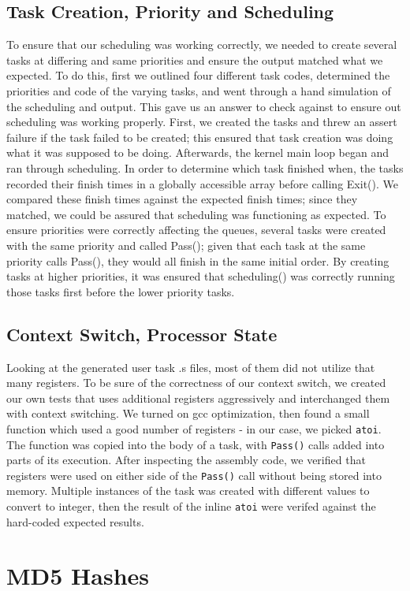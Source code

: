 \documentclass[12pt]{article}
\begin{document}
\subsection{Task Creation, Priority and Scheduling}
To ensure that our scheduling was working correctly, we needed to create several tasks at differing and same priorities and ensure the output matched what we expected.  To do this, first we outlined four different task codes, determined the priorities and code of the varying tasks, and went through a hand simulation of the scheduling and output.  This gave us an answer to check against to ensure out scheduling was working properly.  First, we created the tasks and threw an assert failure if the task failed to be created; this ensured that task creation was doing what it was supposed to be doing.  Afterwards, the kernel main loop began and ran through scheduling.  In order to determine which task finished when, the tasks recorded their finish times in a globally accessible array before calling \textmd{Exit()}.  We compared these finish times against the expected finish times; since they matched, we could be assured that scheduling was functioning as expected.  To ensure priorities were correctly affecting the queues, several tasks were created with the same priority and called \textmd{Pass()}; given that each task at the same priority calls \textmd{Pass()}, they would all finish in the same initial order.  By creating tasks at higher priorities, it was ensured that \textmd{scheduling()} was correctly running those tasks first before the lower priority tasks.
\\[1\baselineskip]
\subsection{Context Switch, Processor State}
Looking at the generated user task .s files, most of them did not utilize that many registers. To be sure of the correctness of our context switch, we created our own tests that uses additional registers aggressively and interchanged them with context switching. We turned on gcc optimization, then found a small function which used a good number of registers - in our case, we picked \texttt{atoi}. The function was copied into the body of a task, with \texttt{Pass()} calls added into parts of its execution. After inspecting the assembly code, we verified that registers were used on either side of the \texttt{Pass()} call without being stored into memory. Multiple instances of the task was created with different values to convert to integer, then the result of the inline \texttt{atoi} were verifed against the hard-coded expected results.
\section{MD5 Hashes}

\end{document}
